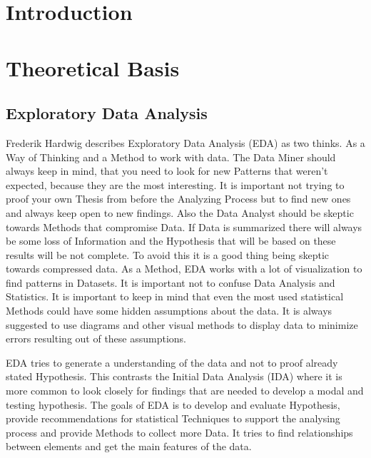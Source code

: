 \documentclass[a4paper, 12pt, oneside]{scrbook}
\begin{document}
	\frontmatter
	
	
	\tableofcontents
	\listoffigures
	\nocite{*}

	\mainmatter

	\pagebreak
	\chapter{Introduction} 
	
	\chapter{Theoretical Basis}
	
		\section{Exploratory Data Analysis} \label{EDA}
			
			\noindent Frederik Hardwig describes Exploratory Data Analysis (\ac{EDA}) as two thinks. As a Way of Thinking and a Method to work with data. 
			The Data Miner should always keep in mind, that you need to look for new Patterns that weren't expected, because they are the most interesting. It is important not trying to proof your own Thesis from before the Analyzing Process but to find new ones and always keep open to new findings. Also the Data Analyst should be skeptic towards Methods that compromise Data. If Data is summarized there will always be some loss of Information and the Hypothesis that will be based on these results will be not complete. To avoid this it is a good thing being skeptic towards compressed data. 
			As a Method, \ac{EDA} works with a lot of visualization to find patterns in Datasets. It is important not to confuse Data Analysis and Statistics. It is important to keep in mind that even the most used statistical Methods could have some hidden assumptions about the data. It is always suggested to use diagrams and other visual methods to display data to minimize errors resulting out of these assumptions.\cite{Hardwig:Explortory_Data_Analysis}
			
			\noindent \ac{EDA} tries to generate a understanding of the data and not to proof already stated Hypothesis. This contrasts the Initial Data Analysis (\ac{IDA}) where it is more common to look closely for findings that are needed to develop a modal and testing hypothesis. The goals of \ac{EDA} is to develop and evaluate Hypothesis, provide recommendations for statistical Techniques to support the analysing process and provide Methods to collect more Data. It tries to find relationships between elements and get the main features of the data. 
			
\end{document}
